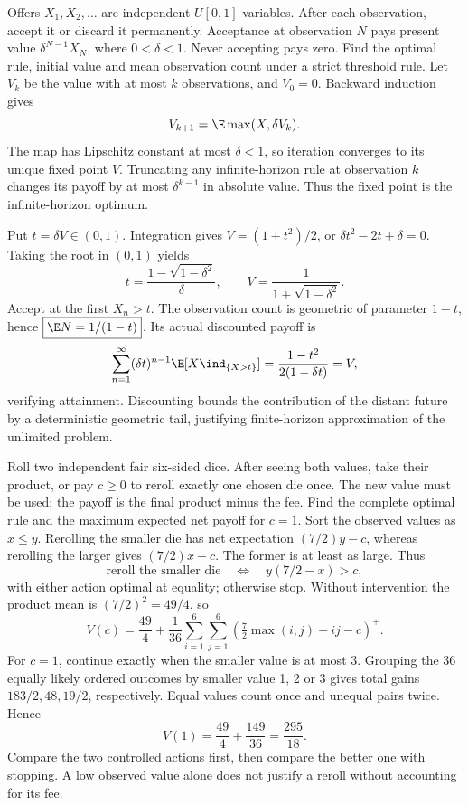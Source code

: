 Offers $X_1,X_2,\ldots$ are independent $U[0,1]$ variables. After each observation, accept it or discard it permanently. Acceptance at observation $N$ pays present value $\delta^{N-1}X_N$, where $0<\delta<1$. Never accepting pays zero. Find the optimal rule, initial value and mean observation count under a strict threshold rule.
\solution Let $V_k$ be the value with at most $k$ observations, and $V_0=0$. Backward induction gives
\[
 V_{k+1}=\E\max(X,\delta V_k).
\]
The map has Lipschitz constant at most $\delta<1$, so iteration converges to its unique fixed point $V$. Truncating any infinite-horizon rule at observation $k$ changes its payoff by at most $\delta^{k-1}$ in absolute value. Thus the fixed point is the infinite-horizon optimum.

Put $t=\delta V\in(0,1)$. Integration gives $V=(1+t^2)/2$, or $\delta t^2-2t+\delta=0$. Taking the root in $(0,1)$ yields
\[
 \boxed{t=\frac{1-\sqrt{1-\delta^2}}\delta},\qquad
 \boxed{V=\frac1{1+\sqrt{1-\delta^2}}}.
\]
Accept at the first $X_n>t$. The observation count is geometric of parameter $1-t$, hence $\boxed{\E N=1/(1-t)}$. Its actual discounted payoff is
\[
 \sum_{n=1}^\infty(\delta t)^{n-1}\E[X\ind_{\{X>t\}}]
 =\frac{1-t^2}{2(1-\delta t)}=V,
\]
verifying attainment.
\insight Discounting bounds the contribution of the distant future by a deterministic geometric tail, justifying finite-horizon approximation of the unlimited problem.

Roll two independent fair six-sided dice. After seeing both values, take their product, or pay $c\ge0$ to reroll exactly one chosen die once. The new value must be used; the payoff is the final product minus the fee. Find the complete optimal rule and the maximum expected net payoff for $c=1$.
\solution Sort the observed values as $x\le y$. Rerolling the smaller die has net expectation $(7/2)y-c$, whereas rerolling the larger gives $(7/2)x-c$. The former is at least as large. Thus
\[
 \boxed{\text{reroll the smaller die}\quad\Longleftrightarrow\quad
 y(7/2-x)>c},
\]
with either action optimal at equality; otherwise stop. Without intervention the product mean is $(7/2)^2=49/4$, so
\[
 V(c)=\frac{49}{4}+\frac1{36}\sum_{i=1}^6\sum_{j=1}^6
 \left(\tfrac72\max(i,j)-ij-c\right)^+.
\]
For $c=1$, continue exactly when the smaller value is at most 3. Grouping the 36 equally likely ordered outcomes by smaller value 1, 2 or 3 gives total gains $183/2,48,19/2$, respectively. Equal values count once and unequal pairs twice. Hence
\[
 \boxed{V(1)=\frac{49}{4}+\frac{149}{36}=\frac{295}{18}}.
\]
\insight Compare the two controlled actions first, then compare the better one with stopping. A low observed value alone does not justify a reroll without accounting for its fee.

